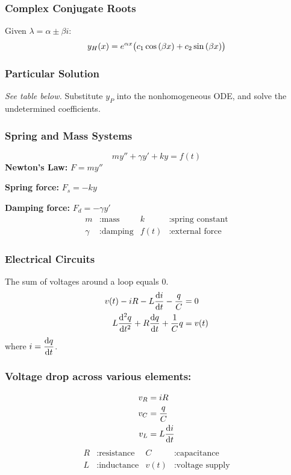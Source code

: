 \documentclass{article}
\begin{document}
\begin{multicols}{3}
    \subsubsection*{Complex Conjugate Roots}
    Given $\lambda = \alpha \pm \beta i$:
    \begin{equation*}
        y_H(x) = e^{\alpha x}\bigl( c_1\cos{\left( \beta x \right)} + c_2 \sin{\left( \beta x \right)} \bigr)
    \end{equation*}
    \subsubsection*{Particular Solution}
    \emph{See table below.}
    Substitute $y_P$ into the nonhomogeneous ODE, and solve the undetermined coefficients.
    \subsubsection*{Spring and Mass Systems}
    \begin{equation*}
        m y'' + \gamma y' + k y = f(t)
    \end{equation*}
    \textbf{Newton's Law:} $F = m y''$

    \textbf{Spring force:} $F_s = -k y$

    \textbf{Damping force:} $F_d = -\gamma y'$
    \begin{align*}
        m      & : \text{mass}    & k    & : \text{spring constant} \\
        \gamma & : \text{damping} & f(t) & : \text{external force}
    \end{align*}
    \subsubsection*{Electrical Circuits}
    The sum of voltages around a loop equals 0.
    \begin{align*}
        v(t) - iR - L \dv{i}{t} - \frac{q}{C}      & = 0    \\
        L \dv[2]{q}{t} + R\dv{q}{t} + \frac{1}{C}q & = v(t)
    \end{align*}
    where $\displaystyle i = \dv{q}{t}$.
    \subsubsection*{Voltage drop across various elements:}
    \begin{align*}
        v_R & = iR          \\
        v_C & = \frac{q}{C} \\
        v_L & = L \dv{i}{t}
    \end{align*}
    \begin{align*}
        R & : \text{resistance} & C    & : \text{capacitance}    \\
        L & : \text{inductance} & v(t) & : \text{voltage supply}
    \end{align*}
\end{multicols}
\end{document}
